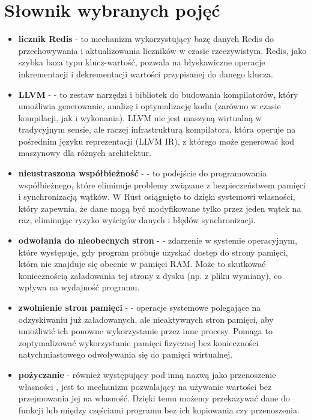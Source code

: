 \newpage
\section{Słownik wybranych pojęć}

\begin{itemize}
    \item \textbf{licznik Redis} - to mechanizm wykorzystujący bazę danych Redis do przechowywania i aktualizowania liczników w czasie rzeczywistym. Redis, jako szybka baza typu klucz-wartość, pozwala na błyskawiczne operacje inkrementacji i dekrementacji wartości przypisanej do danego klucza.

    \item \textbf{LLVM} -  - to zestaw narzędzi i bibliotek do budowania kompilatorów, który umożliwia generowanie, analizę i optymalizację kodu (zarówno w czasie kompilacji, jak i wykonania). LLVM nie jest maszyną wirtualną w tradycyjnym sensie, ale raczej infrastrukturą kompilatora, która operuje na pośrednim języku reprezentacji (LLVM IR), z którego może generować kod maszynowy dla różnych architektur.

    \item \textbf{nieustraszona współbieżność} -  - to podejście do programowania współbieżnego, które eliminuje problemy związane z bezpieczeństwem pamięci i synchronizacją wątków. W Rust osiągnięto to dzięki systemowi własności, który zapewnia, że dane mogą być modyfikowane tylko przez jeden wątek na raz, eliminując ryzyko wyścigów danych i błędów synchronizacji.

    \item \textbf{odwołania do nieobecnych stron} -  - zdarzenie w systemie operacyjnym, które występuje, gdy program próbuje uzyskać dostęp do strony pamięci, która nie znajduje się obecnie w pamięci RAM. Może to skutkować koniecznością załadowania tej strony z dysku (np. z pliku wymiany), co wpływa na wydajność programu.

    \item \textbf{zwolnienie stron pamięci} -  - operacje systemowe polegające na odzyskiwaniu już załadowanych, ale nieaktywnych stron pamięci, aby umożliwić ich ponowne wykorzystanie przez inne procesy. Pomaga to zoptymalizować wykorzystanie pamięci fizycznej bez konieczności natychmiastowego odwoływania się do pamięci wirtualnej.

    \item \textbf{pożyczanie}  - również występujący pod inną nazwą jako przenoszenie własności \cite{rustPolishNames}, jest to mechanizm pozwalający na używanie wartości bez przejmowania jej na własność. Dzięki temu możemy przekazywać dane do funkcji lub między częściami programu bez ich kopiowania czy przenoszenia.


\end{itemize}
